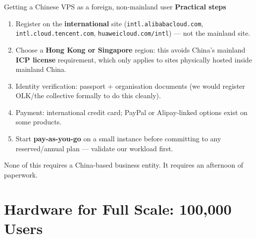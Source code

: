 \documentclass[aspectratio=169,10pt]{beamer}
\newcommand{\eyebrow}[1]{{\small\color{sovGold}\textbf{#1}}}
\begin{document}
\begin{frame}{Getting a Chinese VPS as a foreign, non-mainland user}
  \eyebrow{Practical steps}
  \begin{enumerate}
    \item Register on the \textbf{international} site (\texttt{intl.alibabacloud.com}, \texttt{intl.cloud.tencent.com}, \texttt{huaweicloud.com/intl}) --- not the mainland site.
    \item Choose a \textbf{Hong Kong or Singapore} region: this avoids China's mainland \textbf{ICP license} requirement, which only applies to sites physically hosted inside mainland China.
    \item Identity verification: passport + organisation documents (we would register OLK/the collective formally to do this cleanly).
    \item Payment: international credit card; PayPal or Alipay-linked options exist on some products.
    \item Start \textbf{pay-as-you-go} on a small instance before committing to any reserved/annual plan --- validate our workload first.
  \end{enumerate}
  \vspace{6pt}
  \begin{takeaway}
    None of this requires a China-based business entity. It requires an afternoon of paperwork.
  \end{takeaway}
\end{frame}

\section{Hardware for Full Scale: 100{,}000 Users}
\end{document}
